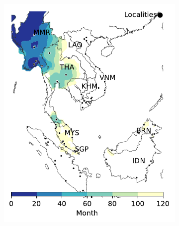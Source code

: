 \documentclass[11pt]{article}
\theoremstyle{definition}
\begin{document}
\begin{figure}[ht]
\begin{subfigure}[b]{.2\textwidth}
    \includegraphics[width=\textwidth]{../../cellular_automata/results/contour/MSA_model-B_m1_l3.pdf}
    \caption{\label{fig:msaClassB}} %
\end{subfigure}
\begin{subfigure}[b]{.135\textwidth}

\end{subfigure}
\end{figure}
\end{document}
